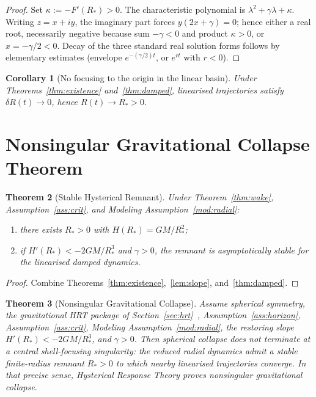 \documentclass[11pt]{article}
\newtheorem{theorem}{Theorem}[section]
\newtheorem{corollary}[theorem]{Corollary}
\theoremstyle{definition}
\theoremstyle{remark}
\newcommand{\GM}{GM}
\begin{document}
\begin{proof}
Set $\kappa:=-F'(R_\ast)>0$.
The characteristic polynomial is $\lambda^{2}+\gamma\lambda+\kappa$.
Writing $z=x+iy$, the imaginary part forces $y(2x+\gamma)=0$; hence either a real root,
necessarily negative because sum $-\gamma<0$ and product $\kappa>0$, or
$x=-\gamma/2<0$.
Decay of the three standard real solution forms follows by elementary estimates
(envelope $e^{-(\gamma/2)t}$, or $e^{r t}$ with $r<0$).
\end{proof}

\begin{corollary}[No focusing to the origin in the linear basin]
\label{cor:nofocus}
Under Theorems~\ref{thm:existence} and~\ref{thm:damped}, linearised trajectories satisfy
$\delta R(t)\to0$, hence $R(t)\to R_\ast>0$.
\end{corollary}

\section{Nonsingular Gravitational Collapse Theorem}
\label{sec:main}
\begin{theorem}[Stable Hysterical Remnant]
\label{thm:remnant}
Under Theorem~\ref{thm:wake}, Assumption~\ref{ass:crit}, and Modeling
Assumption~\ref{mod:radial}:
\begin{enumerate}
\item there exists $R_\ast>0$ with $H(R_\ast)=\GM/R_\ast^{2}$;
\item if $H'(R_\ast)<-2\GM/R_\ast^{3}$ and $\gamma>0$, the remnant is asymptotically
stable for the linearised damped dynamics.
\end{enumerate}
\end{theorem}

\begin{proof}
Combine Theorems~\ref{thm:existence},~\ref{lem:slope}, and~\ref{thm:damped}.
\end{proof}

\begin{theorem}[Nonsingular Gravitational Collapse]
\label{thm:nonsingular}
Assume spherical symmetry, the gravitational HRT package of
Section~\ref{sec:hrt}~\cite{boyd2026response}, Assumption~\ref{ass:horizon},
Assumption~\ref{ass:crit}, Modeling Assumption~\ref{mod:radial}, the restoring slope
$H'(R_\ast)<-2\GM/R_\ast^{3}$, and $\gamma>0$.
Then spherical collapse does not terminate at a central shell-focusing singularity:
the reduced radial dynamics admit a stable finite-radius remnant $R_\ast>0$ to which
nearby linearised trajectories converge.
In that precise sense, Hysterical Response Theory proves nonsingular gravitational
collapse.
\end{theorem}
\end{document}
